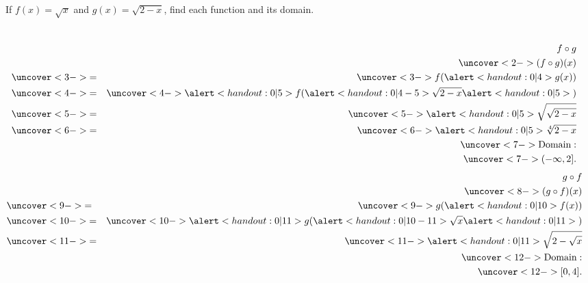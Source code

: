 \begin{frame}
\begin{example}[Example 7, p. 42]
If \alert<handout:0| 5,10>{$f(x) = \sqrt{x}$} and \alert<handout:0| 4,11,15-16>{$g(x) = \sqrt{2 - x}$}, find each function and its domain.
\begin{columns}[t]
\begin{eqnarray*}
& & f\circ g \\
& & \uncover<2->{(f\circ g)(x)}\\
& \uncover<3->{ = } & \uncover<3->{f(\alert<handout:0| 4>{g(x)})}\\
& \uncover<4->{ = } & \uncover<4->{\alert<handout:0| 5>{f(}\alert<handout:0| 4-5>{\sqrt{2 - x}}\alert<handout:0| 5>{)}}\\
& \uncover<5->{ = } & \uncover<5->{\alert<handout:0| 5>{\sqrt{\sqrt{2-x}}}}\\
& \uncover<6->{ = } & \uncover<6->{\alert<handout:0| 5>{\sqrt[4]{2-x}}}\\
&& \uncover<7->{
\textrm{Domain}:}\\
&& \uncover<7->{
(-\infty , 2].
}
\end{eqnarray*}
\begin{eqnarray*}
& &  g \circ f  \\
& & \uncover<8->{(g\circ f)(x)}\\
& \uncover<9->{ = } & \uncover<9->{g(\alert<handout:0| 10>{f(x)})}\\
& \uncover<10->{ = } & \uncover<10->{\alert<handout:0| 11>{g(}\alert<handout:0| 10-11>{\sqrt{x}}\alert<handout:0| 11>{)}}\\
& \uncover<11->{ = } & \uncover<11->{\alert<handout:0| 11>{\sqrt{2 - \sqrt{x}}}}\\
&& \uncover<12->{
\textrm{Domain}:}\\
&& \uncover<12->{
[0 , 4].
}
\end{eqnarray*}

\end{columns}
\end{example}
\end{frame}
